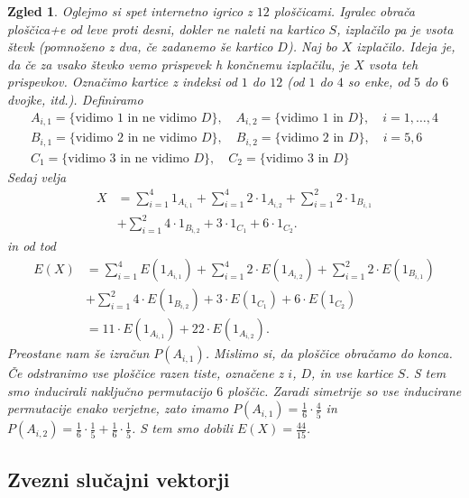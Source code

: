 \documentclass[10pt, a4paper]{article}
\newtheorem{zgled}[izr]{Zgled}
\begin{document}
\begin{zgled}
  Oglejmo si spet internetno igrico z $12$ ploščicami.
  Igralec obrača ploščica+e od leve proti desni, dokler ne naleti na kartico $S$,
  izplačilo pa je vsota števk (pomnoženo z dva, če zadanemo še kartico $D$). Naj bo $X$ izplačilo.
  Ideja je, da če za vsako števko vemo prispevek h končnemu izplačilu, je $X$ vsota teh prispevkov.
  Označimo kartice z indeksi od $1$ do $12$ (od $1$ do $4$ so enke, od $5$ do $6$ dvojke, itd.).
  Definiramo 
  \begin{gather*}
    A_{i, 1} = \{\text{vidimo $1$ in ne vidimo $D$}\},\quad A_{i, 2} = \{\text{vidimo $1$ in $D$}\},\quad i= 1, \dots, 4\\
    B_{i, 1} = \{\text{vidimo $2$ in ne vidimo $D$}\},\quad B_{i, 2} = \{\text{vidimo $2$ in $D$}\},\quad i= 5, 6\\
    C_{1} = \{\text{vidimo $3$ in ne vidimo $D$}\},\quad C_{2} = \{\text{vidimo $3$ in $D$}\}
  \end{gather*}
  Sedaj velja 
  \begin{align*}
    X &= \sum_{i = 1}^4 1_{A_{i, 1}}  + \sum_{i = 1}^4 2 \cdot 1_{A_{i, 2}} + \sum_{i = 1}^2 2 \cdot 1_{B_{i, 1}}\\
    & + \sum_{i = 1}^2 4 \cdot 1_{B_{i, 2}} + 3 \cdot 1_{C_1} + 6 \cdot 1_{C_2}.
  \end{align*}
  in od tod 
  \begin{align*}
    E(X) &= \sum_{i = 1}^4 E(1_{A_{i, 1}})  + \sum_{i = 1}^4 2 \cdot E(1_{A_{i, 2}}) + \sum_{i = 1}^2 2 \cdot E(1_{B_{i, 1}})\\
    & + \sum_{i = 1}^2 4 \cdot E(1_{B_{i, 2}}) + 3 \cdot E(1_{C_1}) + 6 \cdot E(1_{C_2})\\
    &= 11 \cdot E(1_{A_{i, 1}}) + 22 \cdot E(1_{A_{i, 2}}).
  \end{align*}
  Preostane nam še izračun $P(A_{i, 1})$. Mislimo si, da ploščice obračamo do konca. Če odstranimo vse ploščice razen 
  tiste, označene z $i$, $D$, in vse kartice $S$. S tem smo inducirali naključno permutacijo $6$ ploščic.
  Zaradi simetrije so vse inducirane permutacije enako verjetne, zato imamo 
  $P(A_{i, 1}) = \frac{1}{6} \cdot \frac{4}{5}$ in $P(A_{i, 2}) = \frac{1}{6} \cdot \frac{1}{5} + \frac{1}{6} \cdot \frac{1}{5}$.
  S tem smo dobili $E(X) = \frac{44}{15}$.
\end{zgled}

\subsection{Zvezni slučajni vektorji}
\end{document}
